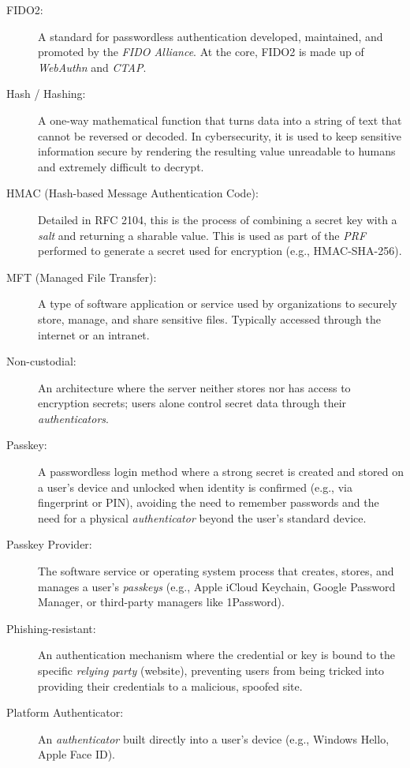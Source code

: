 \begin{description}
\item[FIDO2:] A standard for passwordless authentication developed, maintained, and promoted by the \textit{FIDO Alliance}. At the core, FIDO2 is made up of \textit{WebAuthn} and \textit{CTAP}.

\item[Hash / Hashing:] A one-way mathematical function that turns data into a string of text that cannot be reversed or decoded. In cybersecurity, it is used to keep sensitive information secure by rendering the resulting value unreadable to humans and extremely difficult to decrypt. 

\item[HMAC (Hash-based Message Authentication Code):] Detailed in RFC 2104, this is the process of combining a secret key with a \textit{salt} and returning a sharable value. This is used as part of the \textit{PRF} performed to generate a secret used for encryption (e.g., HMAC-SHA-256). 

\item[MFT (Managed File Transfer):] A type of software application or service used by organizations to securely store, manage, and share sensitive files. Typically accessed through the internet or an intranet. 

\item[Non-custodial:] An architecture where the server neither stores nor has access to encryption secrets; users alone control secret data through their \textit{authenticators}. 

\item[Passkey:] A passwordless login method where a strong secret is created and stored on a user’s device and unlocked when identity is confirmed (e.g., via fingerprint or PIN), avoiding the need to remember passwords and the need for a physical \textit{authenticator} beyond the user’s standard device.

\item[Passkey Provider:] The software service or operating system process that creates, stores, and manages a user's \textit{passkeys} (e.g., Apple iCloud Keychain, Google Password Manager, or third-party managers like 1Password).

\item[Phishing-resistant:] An authentication mechanism where the credential or key is bound to the specific \textit{relying party} (website), preventing users from being tricked into providing their credentials to a malicious, spoofed site.

\item[Platform Authenticator:] An \textit{authenticator} built directly into a user's device (e.g., Windows Hello, Apple Face ID). 


\end{description}
